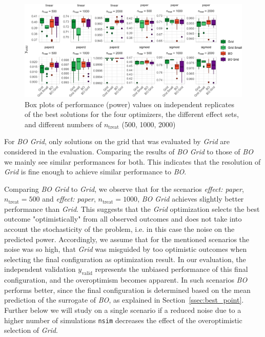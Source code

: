 \documentclass[bimj,fleqn]{w-art}
\theoremstyle{plain}
\theoremstyle{definition}
\begin{document}
\begin{figure}[tbh]
\centering
\includegraphics[width=\linewidth]{generated/figures/plot_boxplot_valid_y.pdf}
\caption{%
  Box plots of performance (power) values on independent replicates of the best solutions for the four optimizers, the different effect sets, and different numbers of $n_{\text{treat}}$ (500, 1000, 2000)
  }
\label{fig:plot_boxplot_valid_y}
\end{figure}

For \emph{BO Grid}, only solutions on the grid that was evaluated by \emph{Grid} are considered in the evaluation. 
Comparing the results of \emph{BO Grid} to those of \emph{BO} we mainly see similar performances for both.
This indicates that the resolution of \emph{Grid} is fine enough to achieve similar performance to \emph{BO}.

Comparing \emph{BO Grid} to \emph{Grid}, we observe that for the scenarios \emph{effect: paper}, $n_{\text{treat}} = 500$ and \emph{effect: paper}, $n_{\text{treat}} = 1000$, \emph{BO Grid} achieves slightly better performance than \emph{Grid}.
This suggests that the \emph{Grid} optimization selects the best outcome "optimistically" from all observed outcomes and does not take into account the stochasticity of the problem, i.e. in this case the noise on the predicted power. 
Accordingly, we assume that for the mentioned scenarios the noise was so high, that \emph{Grid} was misguided by too optimistic outcomes when selecting the final configuration as optimization result.
In our evaluation, the independent validation $y_{\text{valid}}$ represents the unbiased performance of this final configuration, and the overoptimism becomes apparent.
In such scenarios \emph{BO} performs better, since the final configuration is determined based on the mean prediction of the surrogate of \emph{BO}, as explained in Section~\ref{ssec:best_point}.
Further below we will study on a single scenario if a reduced noise due to a higher number of simulations \texttt{nsim} decreases the effect of the overoptimistic selection of \emph{Grid}.
\end{document}
